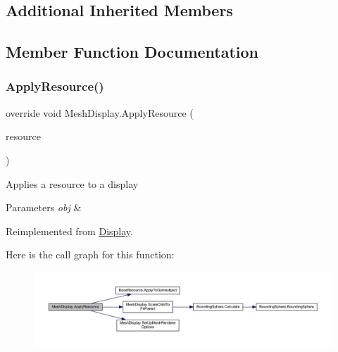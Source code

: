 \subsection*{Additional Inherited Members}


\subsection{Member Function Documentation}
\mbox{\label{class_mesh_display_ab9a24f407a8ff995658097a98242095e}} 
\subsubsection{\texorpdfstring{Apply\+Resource()}{ApplyResource()}}
{\footnotesize\ttfamily override void Mesh\+Display.\+Apply\+Resource (\begin{DoxyParamCaption}\item[{\mbox{\hyperlink{class_base_display_resource}{Base\+Display\+Resource}}}]{resource }\end{DoxyParamCaption})\hspace{0.3cm}{\ttfamily [virtual]}}



Applies a resource to a display 


\begin{DoxyParams}{Parameters}
{\em obj} & \\
\hline
\end{DoxyParams}


Reimplemented from \mbox{\hyperlink{class_display_a811157ddb42ae4d72f690457a08711d3}{Display}}.

Here is the call graph for this function\+:
\nopagebreak
\begin{figure}[H]
\begin{center}
\leavevmode
\includegraphics[width=350pt]{class_mesh_display_ab9a24f407a8ff995658097a98242095e_cgraph}
\end{center}
\end{figure}
\mbox{\label{class_mesh_display_a13c3b8325ff12c302510a38ead46aba3}} 
